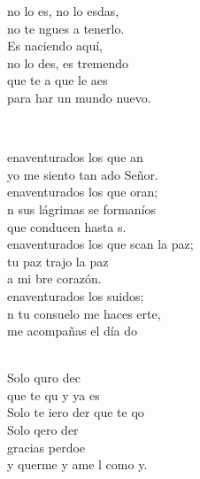 \documentclass[12pt]{article}
\begin{document}
\begin{multicols*}{2}
\begin{cancion}
\begin{chorus}
	no lo es, no lo esdas,\\
	no te ngues a tenerlo.\\
\jump
	Es naciendo aquí,\\
	no lo des, es tremendo\\
	que te a que le aes\\
	para har un mundo nuevo.\\
	\end{chorus}%
	\jump\\
\end{cancion}%

\begin{cancion}%
	enaventurados los que an\\
	yo me siento tan ado Señor.\\
	enaventurados los que oran;\\
	n sus lágrimas se formaníos\\
	que conducen hasta s.   \\
\jump
	enaventurados los que scan la paz;\\
	tu paz trajo la paz\\
	a mi bre corazón.\\
	enaventurados los suidos;\\
	n tu consuelo me haces erte,\\
	me acompañas el día do \\\jump\\
	\begin{chorus}%
	Solo quro dec\\
	que te qu y ya es\\
	Solo te iero der que te qo\\
	Solo qero der\\
	gracias perdoe\\
	y querme y ame l como y.\\

\end{chorus}
\end{cancion}
\end{multicols*}
\end{document}
